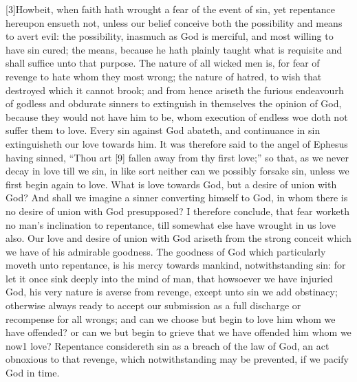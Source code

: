 [3]Howbeit, when faith hath wrought a fear of the event of sin, yet repentance hereupon ensueth not, unless our belief conceive both the possibility and means to avert evil: the possibility, inasmuch as God is merciful, and most willing to have sin cured; the means, because he hath plainly taught what is requisite and shall suffice unto that purpose. The nature of all wicked men is, for fear of revenge to hate whom they most wrong; the nature of hatred, to wish that destroyed which it cannot brook; and from hence ariseth the furious endeavourh of godless and obdurate sinners to extinguish in themselves the opinion of God, because they would not have him to be, whom execution of endless woe doth not suffer them to love. Every sin against God abateth, and continuance in sin extinguisheth our love towards him. It was therefore said to the angel of Ephesus having sinned, “Thou art [9] fallen away from thy first love;” so that, as we never decay in love till we sin, in like sort neither can we possibly forsake sin, unless we first begin again to love. What is love towards God, but a desire of union with God? And shall we imagine a sinner converting himself to God, in whom there is no desire of union with God presupposed? I therefore conclude, that fear worketh no man’s inclination to repentance, till somewhat else have wrought in us love also. Our love and desire of union with God ariseth from the strong conceit which we have of his admirable goodness. The goodness of God which particularly moveth unto repentance, is his mercy towards mankind, notwithstanding sin: for let it once sink deeply into the mind of man, that howsoever we have injuried God, his very nature is averse from revenge, except unto sin we add obstinacy; otherwise always ready to accept our submission as a full discharge or recompense for all wrongs; and can we choose but begin to love him whom we have offended? or can we but begin to grieve that we have offended him whom we now1 love? Repentance considereth sin as a breach of the law of God, an act obnoxious to that revenge, which notwithstanding may be prevented, if we pacify God in time.

